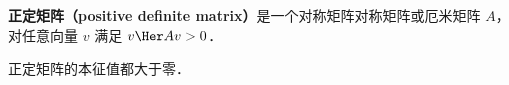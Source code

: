 

\begin{definition}{}
\textbf{正定矩阵（positive definite matrix）}是一个对称矩阵对称矩阵或厄米矩阵 $A$， 对任意向量 $v$ 满足 $v\Her A v > 0$．
\end{definition}

\begin{theorem}{}
正定矩阵的本征值都大于零．
\end{theorem}
